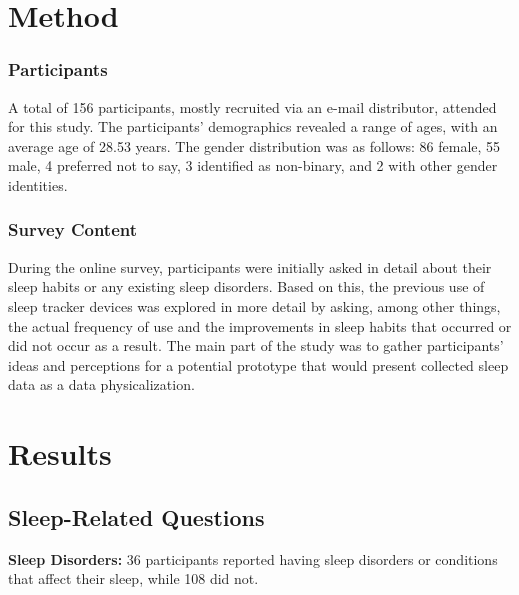 \documentclass[
  a4paper,  %
  twoside,  %
  bibliography=totoc,
  headsepline,
  cleardoublepage=empty,
  parskip=half,
  draft=false
]{scrbook}
\begin{document}
\section{Method}
\subsubsection{Participants}
A total of 156 participants, mostly recruited via an e-mail distributor, attended for this study. The participants' demographics revealed a range of ages, with an average age of 28.53 years. The gender distribution was as follows: 86 female, 55 male, 4 preferred not to say, 3 identified as non-binary, and 2 with other gender identities.
\subsubsection{Survey Content}
During the online survey, participants were initially asked in detail about their sleep habits or any existing sleep disorders. Based on this, the previous use of sleep tracker devices was explored in more detail by asking, among other things, the actual frequency of use and the improvements in sleep habits that occurred or did not occur as a result. The main part of the study was to gather participants' ideas and perceptions for a potential prototype that would present collected sleep data as a data physicalization.


\section{Results}
\subsection{Sleep-Related Questions}

    \textbf{Sleep Disorders:} 36 participants reported having sleep disorders or conditions that affect their sleep, while 108 did not.
    
\end{document}
